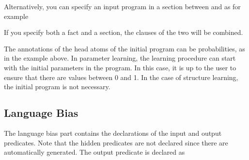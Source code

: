 \documentclass[letterpaper,10pt,english]{sphinxmanual}
\begin{document}
Alternatively, you can specify an input program in a section between  and  as for example

%
\begin{sphinxVerbatim}[commandchars=\\\{\}]
 

 
 
 

 
\end{sphinxVerbatim}

If you specify both a  fact and a section, the clauses of the two will be combined.

The annotations of the head atoms of the initial program can be probabilities, as in the example above. In parameter learning, the learning procedure can start with the initial parameters in the program. In this case, it is up to the user to ensure that there are values between 0 and 1. In the case of structure learning, the initial program is not necessary.


\subsection{Language Bias}
\label{\detokenize{index:language-bias}}
The language bias part contains the declarations of the input and output predicates. Note that the hidden predicates are not declared since there are automatically generated.
The output predicate is declared as

%
\begin{sphinxVerbatim}[commandchars=\\\{\}]
\end{sphinxVerbatim}
\end{document}
